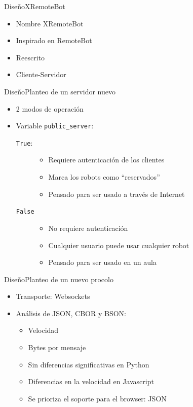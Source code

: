 \documentclass{beamer}
\begin{document}
\begin{frame}{Diseño}{XRemoteBot}
    \begin{itemize}[<+->]
        \item Nombre XRemoteBot
        \item Inspirado en RemoteBot
        \item Reescrito
        \item Cliente-Servidor
    \end{itemize}
\end{frame}

\begin{frame}{Diseño}{Planteo de un servidor nuevo}
    \begin{itemize}[<+->]
        \item 2 modos de operación
        \item Variable \texttt{public\_server}:
            \begin{description}
                \item[\texttt{True}:]
                    \begin{itemize}
                        \item Requiere autenticación de los clientes
                        \item Marca los robots como ``reservados''
                        \item Pensado para ser usado a través de Internet
                    \end{itemize}
                \item[\texttt{False}]
                    \begin{itemize}
                        \item No requiere autenticación
                        \item Cualquier usuario puede usar cualquier robot
                        \item Pensado para ser usado en un aula
                    \end{itemize}
            \end{description}
    \end{itemize}
\end{frame}

\begin{frame}{Diseño}{Planteo de un nuevo procolo}
    \begin{itemize}[<+->]
        \item Transporte: Websockets
        \item Análisis de JSON, CBOR y BSON:
        \begin{itemize}
            \item Velocidad
            \item Bytes por mensaje
            \item Sin diferencias significativas en Python
            \item Diferencias en la velocidad en Javascript
            \item Se prioriza el soporte para el browser: JSON
        \end{itemize}
    \end{itemize}
\end{frame}
\end{document}
